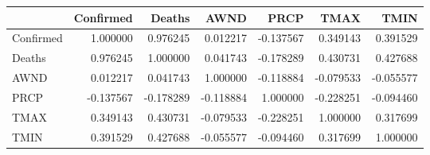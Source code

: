 \begin{tabular}{lrrrrrr}
\toprule
{} &  Confirmed &    Deaths &      AWND &      PRCP &      TMAX &      TMIN \\
\midrule
Confirmed &   1.000000 &  0.976245 &  0.012217 & -0.137567 &  0.349143 &  0.391529 \\
Deaths    &   0.976245 &  1.000000 &  0.041743 & -0.178289 &  0.430731 &  0.427688 \\
AWND      &   0.012217 &  0.041743 &  1.000000 & -0.118884 & -0.079533 & -0.055577 \\
PRCP      &  -0.137567 & -0.178289 & -0.118884 &  1.000000 & -0.228251 & -0.094460 \\
TMAX      &   0.349143 &  0.430731 & -0.079533 & -0.228251 &  1.000000 &  0.317699 \\
TMIN      &   0.391529 &  0.427688 & -0.055577 & -0.094460 &  0.317699 &  1.000000 \\
\bottomrule
\end{tabular}
